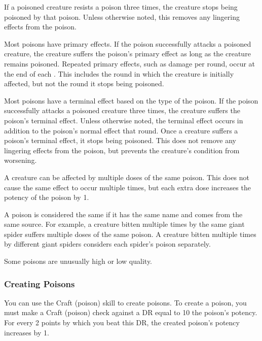             If a poisoned creature resists a poison three times, the creature stops being poisoned by that poison.
            Unless otherwise noted, this removes any lingering effects from the poison.

            Most poisons have primary effects.
            If the poison successfully attacks a poisoned creature, the creature suffers the poison's primary effect as long as the creature remains poisoned.
            Repeated primary effects, such as damage per round, occur at the end of each .
            This includes the round in which the creature is initially affected, but not the round it stops being poisoned.

            Most poisons have a terminal effect based on the type of the poison.
            If the poison successfully attacks a poisoned creature three times, the creature suffers the poison's terminal effect.
            Unless otherwise noted, the terminal effect occurs in addition to the poison's normal effect that round.
            Once a creature suffers a poison's terminal effect, it stops being poisoned.
            This does not remove any lingering effects from the poison, but prevents the creature's condition from worsening.

            A creature can be affected by multiple doses of the same poison.
            This does not cause the same effect to occur multiple times, but each extra dose increases the potency of the poison by 1.

            A poison is considered the same if it has the same name and comes from the same source.
            For example, a creature bitten multiple times by the same giant spider suffers multiple doses of the same poison.
            A creature bitten multiple times by different giant spiders considers each spider's poison separately.

             Some poisons are unusually high or low quality.

        \subsubsection{Creating Poisons}\label{Creating Poisons}

            You can use the Craft (poison) skill to create poisons.
            To create a poison, you must make a Craft (poison) check against a DR equal to 10 \add the poison's potency.
            For every 2 points by which you beat this DR, the created poison's potency increases by 1.

